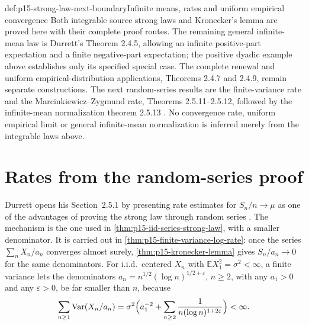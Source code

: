 \begin{proofboundary}{def:p15-strong-law-next-boundary}{Infinite means, rates and uniform empirical convergence}
Both integrable source strong laws and Kronecker's lemma are proved
here with their complete proof routes. The remaining general
infinite-mean law is Durrett's Theorem 2.4.5, allowing an infinite
positive-part expectation and a finite negative-part expectation;
the positive dyadic example above establishes only its specified
special case. The complete renewal and uniform empirical-distribution
applications, Theorems 2.4.7 and 2.4.9, remain separate constructions.
The next random-series results are the finite-variance rate and the
Marcinkiewicz--Zygmund rate, Theorems 2.5.11--2.5.12, followed by the
infinite-mean normalization theorem 2.5.13
\cite[pp.~78--80, 87--90]{DurrettPTEAuthor2019}. No convergence rate,
uniform empirical limit or general infinite-mean normalization is
inferred merely from the integrable laws above.
\end{proofboundary}

\section{Rates from the random-series proof}
\label{sec:p15-w02c-p15-018-rate-comparison}

Durrett opens his Section~2.5.1 by presenting rate estimates for
\(S_n/n\to\mu\) as one of the advantages of proving the strong law
through random series \cite[p.~87]{DurrettPTEAuthor2019}. The
mechanism is the one used in \cref{thm:p15-iid-series-strong-law}, with
a smaller denominator. It is carried out in
\cref{thm:p15-finite-variance-log-rate}: once the series
\(\sum_nX_n/a_n\) converges almost surely,
\cref{thm:p15-kronecker-lemma} gives \(S_n/a_n\to0\) for the same
denominators. For i.i.d.\ centered \(X_n\) with
\(\mathbb EX_1^2=\sigma^2<\infty\), a finite variance lets the
denominators \(a_n=n^{1/2}(\log n)^{1/2+\varepsilon}\), \(n\geq2\),
with any \(a_1>0\) and any \(\varepsilon>0\), be far smaller than
\(n\), because
\[
 \sum_{n\geq1}\operatorname{Var}(X_n/a_n)
  =\sigma^2\Bigl(a_1^{-2}
     +\sum_{n\geq2}\frac1{n(\log n)^{1+2\varepsilon}}\Bigr)<\infty .
\]

